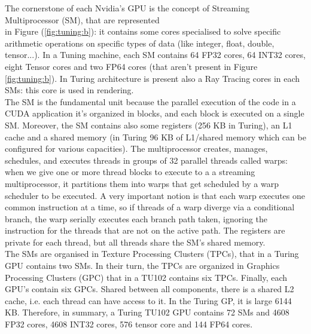 The cornerstone of each Nvidia's GPU is the concept of Streaming Multiprocessor (SM), that are represented\\in Figure (\ref{fig:tuning:b}): it contains some cores specialised to solve specific arithmetic operations on specific types of data (like integer, float, double, tensor...).
In a Tuning machine, each SM contains 64 FP32 cores, 64 INT32 cores, eight Tensor cores and two FP64 cores (that aren't present in Figure \ref{fig:tuning:b}). In Turing architecture is present also a Ray Tracing cores in each SMs: this core is used in rendering.\\
The SM is the fundamental unit because the parallel execution of the code in a CUDA application it's organized in blocks, and each block is executed on a single SM. 
Moreover, the SM contains also some registers (256 KB in Turing), an L1 cache and a shared memory (in Turing 96 KB of L1/shared memory which can be configured for various capacities). 
The multiprocessor creates, manages, schedules, and executes threads in groups of
32 parallel threads called warps: when we give one or more thread blocks to execute to a a streaming multiprocessor, it partitions them into warps that get scheduled by a warp scheduler to be executed. 
A very important notion is that each warp executes one common instruction at a time, so if threads of a warp diverge via a conditional branch, the warp serially executes each branch path taken, ignoring the instruction for the threads that are not on the active path. 
The registers are private for each thread, but all threads share the SM's shared memory.\\
The SMs are organised in Texture Processing Clusters (TPCs), that in a Turing GPU contains two SMs.
In their turn, the TPCs are organized in Graphics Processing Clusters (GPC) that in a TU102 contains six TPCs. Finally, each GPU's contain six GPCs. Shared between all components, there is a shared L2 cache, i.e. each thread can have access to it. In the Turing GP, it is large 6144 KB.
Therefore, in summary, a Turing TU102 GPU contains 72 SMs and 4608 FP32 cores, 4608 INT32 cores, 576 tensor core and 144 FP64 cores.

